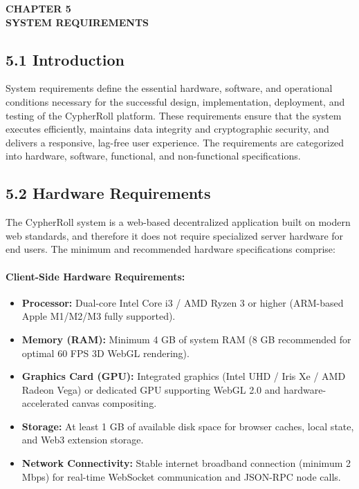 \vspace*{0.5cm}
\begin{center}
\textbf{CHAPTER 5}\\[0.15cm]
\textbf{SYSTEM REQUIREMENTS}
\end{center}
\label{chap:requirements}
\vspace{0.2cm}

\subsection*{5.1 Introduction}
System requirements define the essential hardware, software, and operational conditions necessary for the successful design, implementation, deployment, and testing of the CypherRoll platform. These requirements ensure that the system executes efficiently, maintains data integrity and cryptographic security, and delivers a responsive, lag-free user experience. The requirements are categorized into hardware, software, functional, and non-functional specifications.

\subsection*{5.2 Hardware Requirements}
The CypherRoll system is a web-based decentralized application built on modern web standards, and therefore it does not require specialized server hardware for end users. The minimum and recommended hardware specifications comprise:

\paragraph{Client-Side Hardware Requirements:}
\begin{itemize}[leftmargin=1.5em]
    \item \textbf{Processor:} Dual-core Intel Core i3 / AMD Ryzen 3 or higher (ARM-based Apple M1/M2/M3 fully supported).
    \item \textbf{Memory (RAM):} Minimum 4 GB of system RAM (8 GB recommended for optimal 60 FPS 3D WebGL rendering).
    \item \textbf{Graphics Card (GPU):} Integrated graphics (Intel UHD / Iris Xe / AMD Radeon Vega) or dedicated GPU supporting WebGL 2.0 and hardware-accelerated canvas compositing.
    \item \textbf{Storage:} At least 1 GB of available disk space for browser caches, local state, and Web3 extension storage.
    \item \textbf{Network Connectivity:} Stable internet broadband connection (minimum 2 Mbps) for real-time WebSocket communication and JSON-RPC node calls.
\end{itemize}

